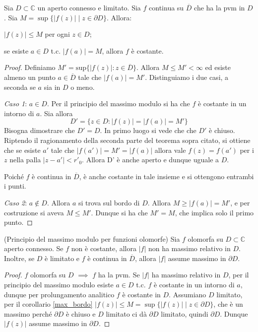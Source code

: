 \begin{cor} \label{max_bordo}
  Sia $D \subset \mathbb{C}$ un aperto connesso e limitato. Sia $f$ continua su $\overline{D}$ che ha la pvm in $D$. Sia $M=\sup\{|f(z)| \mid z \in \partial D\}$. Allora:
  \begin{nlist}
    \item $|f(z)| \le M$ per ogni $z \in D$;
    \item se esiste $a \in D$ t.c. $|f(a)|=M$, allora $f$ è costante.
  \end{nlist}
\end{cor}

\begin{proof}
    Definiamo $M'=\text{sup}\{|f(z)|:z\in\overline{D}\}$. Allora $M\leq
    M'<\infty$ ed esiste almeno un punto $a\in\overline{D}$ tale che
    $|f(a)|=M'$. Distinguiamo i due casi, a seconda se $a$ sia in $D$ o meno.

    \emph{Caso 1}: $a\in D$. Per il principio del massimo modulo si ha che $f$
    \`e costante in un intorno di $a$. Sia allora
    \[
        D' = \{z\in D: |f(z)|=|f(a)|=M'\}
    \]
    Bisogna dimostrare che $D'=D$. In primo luogo si vede che che $D'$ \`e
    chiuso.
    Riptendo il ragionamento della seconda parte del teorema sopra citato, si
    ottiene che se esiste $a'$ tale che $|f(a')|=M'=|f(a)|$ allora vale
    $f(z)=f(a')$ per i $z$ nella palla $|z-a'|<r'_0$. Allora D' \`e anche aperto
    e dunque uguale a $D$.

    Poich\'e $f$ \`e continua in $\overline{D}$, \`e anche costante in tale
    insieme e si ottengono entrambi i punti.

    \emph{Caso 2}: $a\notin D$. Allora $a$ si trova sul bordo di $D$. Allora
    $M\geq |f(a)| = M'$, e per costruzione si aveva $M\leq M'$. Dunque si ha che
    $M'=M$, che implica solo il primo punto.
\end{proof}

\begin{cor}
  (Principio del massimo modulo per funzioni olomorfe) Sia $f$ olomorfa su $D \subset \mathbb{C}$ aperto connesso. Se $f$ non è costante, allora $|f|$ non ha massimo relativo in $D$. Inoltre, se $D$ è limitato e $f$ è continua in $\overline{D}$, allora $|f|$ assume massimo in $\partial D$.
\end{cor}

\begin{proof}
  $f$ olomorfa su $D$ $\implies$ $f$ ha la pvm. Se $|f|$ ha massimo relativo in $D$, per il principio del massimo modulo esiste $a \in D$ t.c. $f$ è costante in un intorno di $a$, dunque per prolungamento analitico $f$ è costante in $D$.
  Assumiano $D$ limitato, per il corollario \ref{max_bordo} $|f(z)| \le M=\sup\{|f(z)| \mid z \in \partial D\}$, che è un massimo perché $\partial D$ è chiuso e $D$ limitato ci dà $\partial D$ limitato, quindi $\partial D$. Dunque $|f(z)|$ assume massimo in $\partial D$.
\end{proof}

